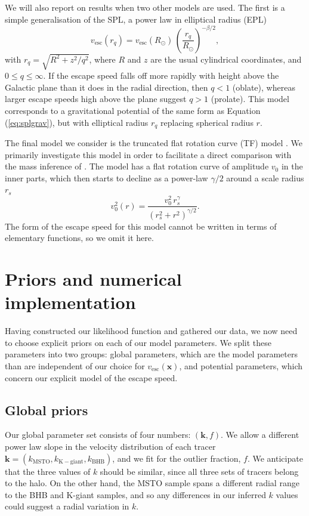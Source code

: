 \documentclass[useAMS,twocolumn,usenatbib]{mn2e}
\def\vesc{{v_\mathrm{esc}}}
\def\pos{{\boldsymbol{x}}}
\begin{document}
We will also report on results when two other models are used. 
The first is a simple generalisation of the SPL, a power law in elliptical radius (EPL)
%
\begin{equation}
\vesc(r_q) = \vesc(R_\odot)\,\left(\dfrac{r_q}{R_\odot}\right)^{-\beta/2},
\end{equation}
%
with $r_q = \sqrt{R^2 + z^2/q^2}$, where $R$ and $z$ are the usual cylindrical coordinates, and $0 \leq q \leq \infty$. 
If the escape speed falls off more rapidly with height above the Galactic plane than it does in the radial direction, then $q<1$ (oblate), whereas larger escape speeds high above the plane suggest $q>1$ (prolate). 
This model corresponds to a gravitational potential of the same form as Equation (\ref{eq:splgrav}), but with elliptical radius $r_q$ replacing spherical radius $r$.

The final model we consider is the truncated flat rotation curve (TF) model \citep[see][]{Gi14,Wi99}. 
We primarily investigate this model in order to facilitate a direct comparison with the mass inference of \citet{Gi14}.
The model has a flat rotation curve of amplitude $v_0$ in the inner parts, which then starts to decline as a power-law $\gamma/2$ around a scale radius $r_s$
%
\begin{equation}
v_0^2(r) = \dfrac{v_0^2\,r_s^\gamma}{(r_s^2 + r^2)^{\gamma/2}}.
\end{equation}
%
The form of the escape speed for this model cannot be written in terms of elementary functions, so we omit it here.

\section{Priors and numerical implementation}

\label{sec:pannm}

Having constructed our likelihood function and gathered our data, we now need to choose explicit priors on each of our model parameters. 
We split these parameters into two groups: global parameters, which are the model parameters than are independent of our choice for $\vesc(\pos)$, and potential parameters, which concern our explicit model of the escape speed.

\subsection{Global priors}

Our global parameter set consists of four numbers: $(\boldsymbol{k},f)$. 
We allow a different power law slope in the velocity distribution of each tracer $\boldsymbol{k} = (k_\mathrm{MSTO},k_\mathrm{K-giant},k_\mathrm{BHB})$, and we fit for the outlier fraction, $f$. 
We anticipate that the three values of $k$ should be similar, since all three sets of tracers belong to the halo.
On the other hand, the MSTO sample spans a different radial range to the BHB and K-giant samples, and so any differences in our inferred $k$ values could suggest a radial variation in $k$.
\end{document}
